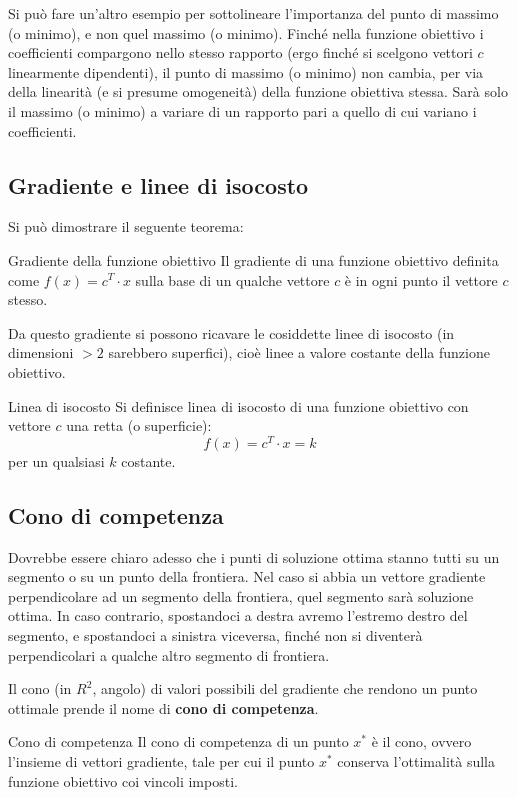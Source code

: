 \documentclass[a4paper,11pt]{article}
\begin{document}
Si può fare un'altro esempio per sottolineare l'importanza del punto di massimo (o minimo), e non quel massimo (o minimo).
Finché nella funzione obiettivo i coefficienti compargono nello stesso rapporto (ergo finché si scelgono vettori $c$ linearmente dipendenti), il punto di massimo (o minimo) non cambia, per via della linearità (e si presume omogeneità) della funzione obiettiva stessa.
Sarà solo il massimo (o minimo) a variare di un rapporto pari a quello di cui variano i coefficienti.

\subsection{Gradiente e linee di isocosto}
Si può dimostrare il seguente teorema:
\begin{theorem}{Gradiente della funzione obiettivo}
	Il gradiente di una funzione obiettivo definita come $ f(x) = c^T \cdot x $ sulla base di un qualche vettore $c$ è in ogni punto il vettore $c$ stesso.
\end{theorem}
Da questo gradiente si possono ricavare le cosiddette linee di isocosto (in dimensioni $>2$ sarebbero superfici), cioè linee a valore costante della funzione obiettivo.
\begin{definition}{Linea di isocosto}
	Si definisce linea di isocosto di una funzione obiettivo con vettore $c$ una retta (o superficie):	
	$$ f(x) = c^T \cdot x = k $$
	per un qualsiasi $k$ costante.
\end{definition}

\subsection{Cono di competenza}
Dovrebbe essere chiaro adesso che i punti di soluzione ottima stanno tutti su un segmento o su un punto della frontiera.
Nel caso si abbia un vettore gradiente perpendicolare ad un segmento della frontiera, quel segmento sarà soluzione ottima. In caso contrario, spostandoci a destra avremo l'estremo destro del segmento, e spostandoci a sinistra viceversa, finché non si diventerà perpendicolari a qualche altro segmento di frontiera.

Il cono (in $R^2$, angolo) di valori possibili del gradiente che rendono un punto ottimale prende il nome di \textbf{cono di competenza}.
\begin{definition}{Cono di competenza}
	Il cono di competenza di un punto $x^*$ è il cono, ovvero l'insieme di vettori gradiente, tale per cui il punto $x^*$ conserva l'ottimalità sulla funzione obiettivo coi vincoli imposti.
\end{definition}
\end{document}
